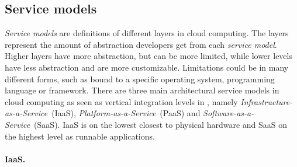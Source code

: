 \subsection{Service models}

\emph{Service models} are definitions of different layers in cloud computing.
The layers represent the amount of abstraction developers get from each \emph{service model}.
Higher layers have more abstraction, but can be more limited, while lower levels 
have less abstraction and are more customizable.
Limitations could be in many different forms, such as bound to a specific operating system,
programming language or framework.
There are three main architectural service models in cloud computing\cite{nist:mell11}
as seen as vertical integration levels in ,
namely \emph{Infrastructure-as-a-Service}~(IaaS), \emph{Platform-as-a-Service}~(PaaS)
and \emph{Software-as-a-Service}~(SaaS).
IaaS is on the lowest closest to physical hardware and SaaS on the highest
level as runnable applications.

  \paragraph{IaaS.}

